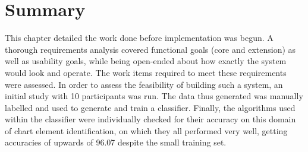\section{Summary}
This chapter detailed the work done before implementation was begun. A thorough requirements analysis covered functional goals (core and extension) as well as usability goals, while being open-ended about how exactly the system would look and operate. The work items required to meet these requirements were assessed. In order to assess the feasibility of building such a system, an initial study with 10 participants was run. The data thus generated was manually labelled and used to generate and train a classifier. Finally, the algorithms used within the classifier were individually checked for their accuracy on this domain of chart element identification, on which they all performed very well, getting accuracies of upwards of 96.07 despite the small training set.